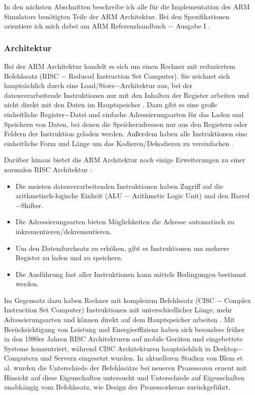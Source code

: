 \documentclass[a4paper, 11pt, onecolumn]{article}
\begin{document}
In den nächsten Abschnitten beschreibe ich alle für die Implementation des ARM Simulators benötigten Teile der ARM Architektur. Bei den Spezifikationen orientiere ich mich dabei am ARM Referenzhandbuch $-$ Ausgabe I \cite{arm:2005}.

\subsubsection{Architektur}\label{sec:architecture}

Bei der ARM Architektur handelt es sich um einen Rechner mit reduziertem Befehlssatz (RISC $-$ Reduced Instruction Set Computer). Sie zeichnet sich hauptsächlich durch eine Load/Store$-$Architektur aus, bei der datenverarbeitende Instruktionen nur mit den Inhalten der Register arbeiten und nicht direkt mit den Daten im Hauptspeicher \cite{risc}. Dazu gibt es eine große einheitliche Register$-$Datei und einfache Adressierungsarten für das Laden und Speichern von Daten, bei denen die Speicheradressen nur aus den Registern oder Feldern der Instruktion geladen werden. Außerdem haben alle Instruktionen eine einheitliche Form und Länge um das Kodieren/Dekodieren zu vereinfachen \cite{arm:2005}\cite{risc}.

Darüber hinaus bietet die ARM Architektur noch einige Erweiterungen zu einer normalen RISC Architektur \cite{arm:2005}: 

\begin{itemize}
\item Die meisten datenverarbeitenden Instruktionen haben Zugriff auf die arithmetisch-logische Einheit (ALU $-$ Arithmetic Logic Unit) und den Barrel$-$Shifter.
\item Die Adressierungsarten bieten Möglichkeiten die Adresse automatisch zu inkrementieren/dekrementieren.
\item Um den Datendurchsatz zu erhöhen, gibt es Instruktionen um mehrere Register zu laden und zu speichern. 
\item Die Ausführung fast aller Instruktionen kann mittels Bedingungen bestimmt werden.
\end{itemize}
 
Im Gegensatz dazu haben Rechner mit komplexem Befehlssatz (CISC $-$ Complex Instruction Set Computer) Instruktionen mit unterschiedlicher Länge, mehr Adressierungsarten und können direkt auf dem Hauptspeicher arbeiten \cite{risc}. Mit Berücksichtigung von Leistung und Energieeffizienz haben sich besonders früher in den 1980er Jahren RISC Architekturen auf mobile Geräten und eingebettete Systeme konzentriert, während CISC Architekturen hauptsächlich in Desktop$-$Computern und Servern eingesetzt wurden. In aktuelleren Studien von Blem et al. \cite{risc} wurden die Unterschiede der Befehlssätze bei neueren Prozessoren erneut mit Hinsicht auf diese Eigenschaften untersucht und Unterschiede auf Eigenschaften unabhängig vom Befehlssatz, wie Design der Prozessorkerne zurückgeführt.
\end{document}
